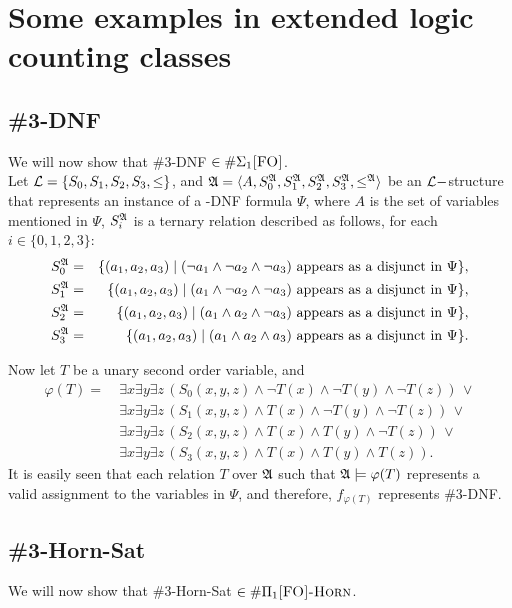 \section{Some examples in extended logic counting classes}

\subsection{{\sc \#3-DNF}}
We will now show that {\sc \#3-DNF} $\in\#\Sigma_1\textsc{[FO]}$.\\

Let ${\cal L} = \{S_0,S_1,S_2,S_3,\leq\}$, and ${\frak A} = \langle A, S_0^{\frak A}, S_1^{\frak A}, S_2^{\frak A}, S_3^{\frak A}, \leq^{\frak A} \rangle$ be an ${\cal L}-$structure that represents an instance of a {-DNF} formula $\Psi$, where $A$ is the set of variables mentioned in $\Psi$, $S_i^{\frak A}$ is a ternary relation described as follows, for each $i\in\{0,1,2,3\}$:
\begin{eqnarray*}
S_0^{\frak A} &=& \{(a_1,a_2,a_3)\mid (\neg a_1 \wedge \neg a_2 \wedge \neg a_3) \mbox{ appears as a disjunct in }\Psi\},\\
S_1^{\frak A} &=& \{(a_1,a_2,a_3)\mid ( a_1 \wedge \neg a_2 \wedge \neg a_3) \mbox{ appears as a disjunct in }\Psi\},\\
S_2^{\frak A} &=& \{(a_1,a_2,a_3)\mid ( a_1 \wedge  a_2 \wedge \neg a_3) \mbox{ appears as a disjunct in }\Psi\},\\
S_3^{\frak A} &=& \{(a_1,a_2,a_3)\mid ( a_1 \wedge  a_2 \wedge  a_3) \mbox{ appears as a disjunct in }\Psi\}.
\end{eqnarray*}

Now let $T$ be a unary second order variable, and
\begin{align*}
\varphi(T) =\ &\exists x \exists y \exists z \,(S_0(x,y,z) \wedge \neg T(x) \wedge \neg T(y) \wedge \neg T(z))\,\vee \\
&\exists x \exists y \exists z \,(S_1(x,y,z) \wedge T(x) \wedge \neg T(y) \wedge \neg T(z))\,\vee \\
&\exists x \exists y \exists z \,(S_2(x,y,z) \wedge T(x) \wedge T(y) \wedge \neg T(z))\,\vee \\
&\exists x \exists y \exists z \,(S_3(x,y,z) \wedge T(x) \wedge T(y) \wedge T(z)).
\end{align*}
It is easily seen that each relation $T$ over ${\frak A}$ such that ${\frak A}\models\varphi(T)$ represents a valid assignment to the variables in $\Psi$, and therefore, $f_{\varphi(T)}$ represents {\sc \#3-DNF}.

\subsection{{\sc \#3-Horn-Sat}}
We will now show that {\sc \#3-Horn-Sat} $\in\#\Pi_1\textsc{[FO]-Horn}$.\\

